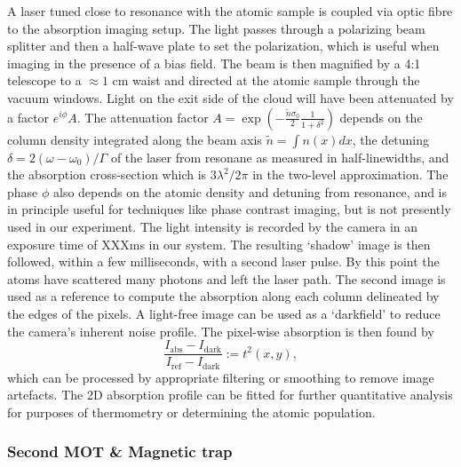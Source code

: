 A laser tuned close to resonance with the atomic sample is coupled via optic fibre to the absorption imaging setup.
	The light passes through a polarizing beam splitter and then a half-wave plate to set the polarization, which is useful when imaging in the presence of a bias field.
	The beam is then magnified by a 4:1 telescope to a $\approx1$ cm waist and directed at the atomic sample through the vacuum windows.
	Light on the exit side of the cloud will have been attenuated by a factor $e^{i\phi}A$.
	 The attenuation factor $A=\exp(-\frac{\tilde{n}\sigma_0}{2}\frac{1}{1+\delta^2})$ depends on the column density integrated along the beam axis $\tilde{n} = \int n(x) dx$, the detuning $\delta=2(\omega-\omega_0)/\Gamma$ of the laser from resonane as measured in half-linewidths, and the absorption cross-section which is $3\lambda^2/2\pi$ in the two-level approximation.
	The phase $\phi$ also depends on the atomic density and detuning from resonance, and is in principle useful for techniques like phase contrast imaging, but is not presently used in our experiment.
	The light intensity is recorded by the camera in an exposure time of XXXms in our system.
	The resulting `shadow' image is then followed, within a few milliseconds, with a second laser pulse.
	By this point the atoms have scattered many photons and left the laser path.
	The second image is used as a reference to compute the absorption along each column delineated by the edges of the pixels.
	A light-free image can be used as a `darkfield' to reduce the camera's inherent noise profile.
	The pixel-wise absorption is then found by
\begin{equation}
	\frac{I_\textrm{abs}-I_\textrm{dark}}{I_\textrm{ref}-I_\textrm{dark}}:=t^2(x,y),
\end{equation}
which can be processed by appropriate filtering or smoothing to remove image artefacts.
	The 2D absorption profile can be fitted for further quantitative analysis for purposes of thermometry or determining the atomic population.

\subsubsection{Second MOT \& Magnetic trap}

